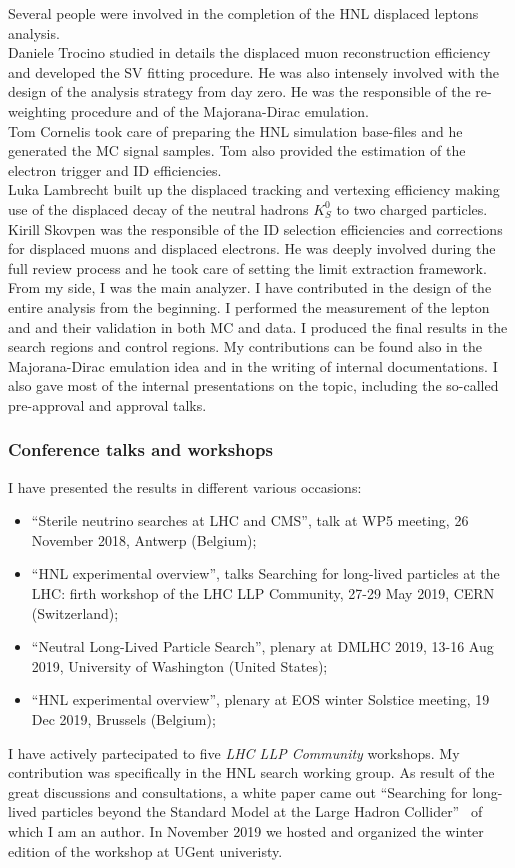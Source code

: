 Several people were involved in the completion of the HNL displaced leptons
analysis.\\
Daniele Trocino studied in details the displaced muon reconstruction
efficiency and developed the SV fitting procedure. He was also
intensely involved with the design of the analysis strategy from day zero. He was
the responsible of the re-weighting procedure and of the
Majorana-Dirac emulation.\\
Tom Cornelis took care of preparing the HNL simulation base-files and
he generated the MC signal samples. Tom also provided the estimation
of the electron trigger and ID efficiencies. \\
Luka Lambrecht built up the displaced tracking and vertexing
efficiency making use of the displaced decay of the neutral hadrons $K_S^{0}$ to
two charged particles.\\
Kirill Skovpen was the responsible of the ID selection efficiencies and
corrections for displaced muons and displaced electrons. He was deeply
involved during the full review process and he took care of setting
the limit extraction framework. \\
From my side, I was the main analyzer. I have contributed in the design of the
entire analysis from the beginning. I performed the measurement of the
lepton \fr and \Dfr and their validation in both MC and data. I
produced the final results in the search regions and control
regions. My contributions can be found also in the Majorana-Dirac
emulation idea and in the writing of internal documentations. I also
gave most of the internal presentations on the topic, including the
so-called pre-approval and approval talks.
\subsubsection*{Conference talks and workshops}
I have presented the results in different various occasions:
\begin{itemize}
\item ``Sterile neutrino searches at LHC and CMS'', talk at WP5
  meeting, 26 November 2018, Antwerp (Belgium);
\item ``HNL experimental overview'', talks Searching for long-lived
  particles at the LHC: firth workshop of the LHC LLP Community, 27-29
  May 2019, CERN (Switzerland);
\item ``Neutral Long-Lived Particle Search'', plenary at DM\@ LHC 2019, 13-16 Aug 2019, University of Washington (United States);
\item ``HNL experimental overview'', plenary at EOS winter Solstice
  meeting, 19 Dec 2019, Brussels (Belgium);
\end{itemize}

I have actively partecipated to five \emph{LHC LLP Community}
workshops. My contribution was specifically in the HNL search working
group. As result of the great discussions and consultations, a white
paper came out ``Searching for long-lived particles beyond the
Standard Model at the Large Hadron Collider''~\cite{Alimena_2020} of
which I am an author. In November 2019 we hosted and organized the winter edition
of the workshop at UGent univeristy.